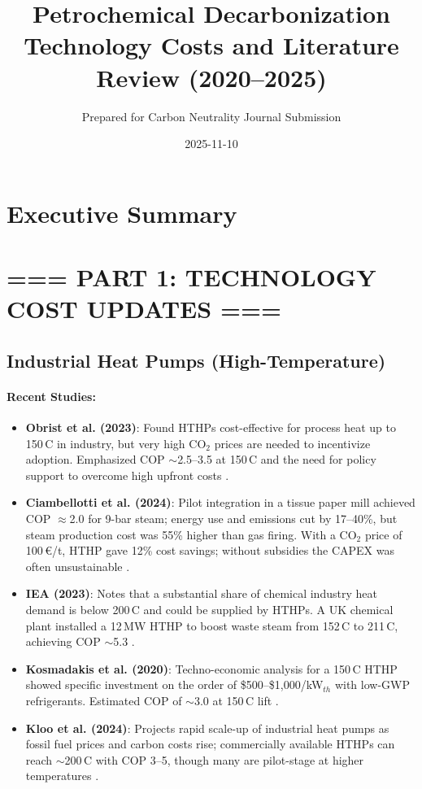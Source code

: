 \documentclass[11pt]{article}
\title{Petrochemical Decarbonization Technology Costs and Literature Review (2020--2025)}
\author{Prepared for Carbon Neutrality Journal Submission}
\date{2025-11-10}
\begin{document}
\maketitle
\doublespacing

\section*{Executive Summary}


\section*{=== PART 1: TECHNOLOGY COST UPDATES ===}

\subsection{Industrial Heat Pumps (High-Temperature)}

\paragraph{Recent Studies:}
\begin{itemize}
    \item \textbf{Obrist et al. (2023)}: Found HTHPs cost-effective for process heat up to 150\,\degree C in industry, but very high CO$_2$ prices are needed to incentivize adoption. Emphasized COP $\sim$2.5--3.5 at 150\,\degree C and the need for policy support to overcome high upfront costs \citep{Obrist2023}.
    \item \textbf{Ciambellotti et al. (2024)}: Pilot integration in a tissue paper mill achieved COP $\approx$2.0 for 9-bar steam; energy use and emissions cut by 17--40\%, but steam production cost was 55\% higher than gas firing. With a CO$_2$ price of 100\,\euro/t, HTHP gave 12\% cost savings; without subsidies the CAPEX was often unsustainable \citep{Ciambellotti2024}.
    \item \textbf{IEA (2023)}: Notes that a substantial share of chemical industry heat demand is below 200\,\degree C and could be supplied by HTHPs. A UK chemical plant installed a 12\,MW HTHP to boost waste steam from 152\,\degree C to 211\,\degree C, achieving COP $\sim$5.3 \citep{IEA2023}.
    \item \textbf{Kosmadakis et al. (2020)}: Techno-economic analysis for a 150\,\degree C HTHP showed specific investment on the order of \$500--\$1{,}000/kW$_{th}$ with low-GWP refrigerants. Estimated COP of $\sim$3.0 at 150\,\degree C lift \citep{Kosmadakis2020}.
    \item \textbf{Kloo et al. (2024)}: Projects rapid scale-up of industrial heat pumps as fossil fuel prices and carbon costs rise; commercially available HTHPs can reach $\sim$200\,\degree C with COP 3--5, though many are pilot-stage at higher temperatures \citep{Kloo2024}.
\end{itemize}
\end{document}
